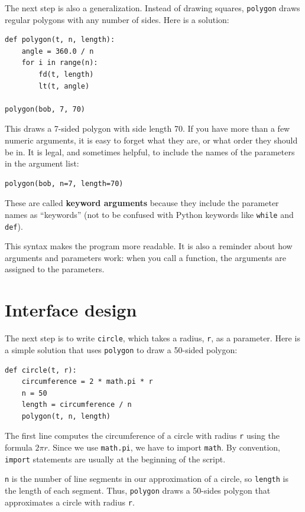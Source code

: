 \documentclass[10pt]{book}
\begin{document}

The next step is also a generalization.  Instead of drawing
squares, {\tt polygon} draws regular polygons with any number of
sides.  Here is a solution:

\beforeverb
\begin{verbatim}
def polygon(t, n, length):
    angle = 360.0 / n
    for i in range(n):
        fd(t, length)
        lt(t, angle)

polygon(bob, 7, 70)
\end{verbatim}
\afterverb
%
This draws a 7-sided polygon with side length 70.  If you have
more than a few numeric arguments, it is easy to forget what they
are, or what order they should be in.  It is legal, and sometimes
helpful, to include the names of the parameters in the argument
list:

\beforeverb
\begin{verbatim}
polygon(bob, n=7, length=70)
\end{verbatim}
\afterverb
%
These are called {\bf keyword arguments} because they include
the parameter names as ``keywords'' (not to be confused with
Python keywords like {\tt while} and {\tt def}).


This syntax makes the program more readable.  It is also a reminder
about how arguments and parameters work: when you call a function, the
arguments are assigned to the parameters.


\section{Interface design}

The next step is to write {\tt circle}, which takes a radius,
{\tt r}, as a parameter.  Here is a simple solution that uses
{\tt polygon} to draw a 50-sided polygon:

\beforeverb
\begin{verbatim}
def circle(t, r):
    circumference = 2 * math.pi * r
    n = 50
    length = circumference / n
    polygon(t, n, length)
\end{verbatim}
\afterverb
%
The first line computes the circumference of a circle with radius
{\tt r} using the formula $2 \pi r$.  Since we use {\tt math.pi}, we
have to import {\tt math}.  By convention, {\tt import} statements
are usually at the beginning of the script.

{\tt n} is the number of line segments in our approximation of a circle,
so {\tt length} is the length of each segment.  Thus, {\tt polygon}
draws a 50-sides polygon that approximates a circle with radius {\tt r}.
\end{document}
